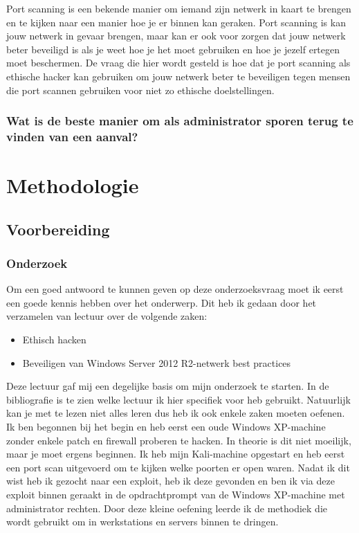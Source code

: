 \documentclass[pdftex,a4paper,12pt]{report}
\begin{document}
Port scanning is een bekende manier om iemand zijn netwerk in kaart te brengen en te kijken naar een manier hoe je er binnen kan geraken. Port scanning is kan jouw netwerk in gevaar brengen, maar kan er ook voor zorgen dat jouw netwerk beter beveiligd is als je weet hoe je het moet gebruiken en hoe je jezelf ertegen moet beschermen. De vraag die hier wordt gesteld is hoe dat je port scanning als ethische hacker kan gebruiken om jouw netwerk beter te beveiligen tegen mensen die port scannen gebruiken voor niet zo ethische doelstellingen.

\subsection{Wat is de beste manier om als administrator sporen terug te vinden van een aanval?}

\chapter{Methodologie}
\label{ch:methodologie}

\section{Voorbereiding}
\subsection{Onderzoek}
Om een goed antwoord te kunnen geven op deze onderzoeksvraag moet ik eerst een goede kennis hebben over het onderwerp. Dit heb ik gedaan door het verzamelen van lectuur over de volgende zaken:
\begin{itemize}
	\item Ethisch hacken
	\item Beveiligen van Windows Server 2012 R2-netwerk best practices
\end{itemize}
Deze lectuur gaf mij een degelijke basis om mijn onderzoek te starten. In de bibliografie is te zien welke lectuur ik hier specifiek voor heb gebruikt. Natuurlijk kan je met te lezen niet alles leren dus heb ik ook enkele zaken moeten oefenen. Ik ben begonnen bij het begin en heb eerst een oude Windows XP-machine zonder enkele patch en firewall proberen te hacken. In theorie is dit niet moeilijk, maar je moet ergens beginnen. Ik heb mijn Kali-machine opgestart en heb eerst een port scan uitgevoerd om te kijken welke poorten er open waren. Nadat ik dit wist heb ik gezocht naar een exploit, heb ik deze gevonden en ben ik via deze exploit binnen geraakt in de opdrachtprompt van de Windows XP-machine met administrator rechten. Door deze kleine oefening leerde ik de methodiek die wordt gebruikt om in werkstations en servers binnen te dringen. \newline \newline
\end{document}
